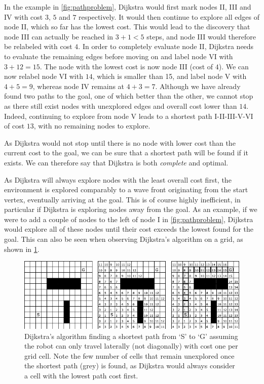 In the example in \cref{fig:pathproblem}, Dijkstra would first mark nodes II, III and IV with cost $3$, $5$ and $7$ respectively. It would then continue to explore all edges of node II, which so far has the lowest cost. This would lead to the discovery that node III can actually be reached in $3+1<5$ steps, and node III would therefore be relabeled with cost $4$. In order to completely evaluate node II, Dijkstra needs to evaluate the remaining edges before moving on and label node VI with $3+12=15$.
%
The node with the lowest cost is now node III (cost of $4$). We can now relabel node VI with $14$, which is smaller than 15, and label node V with $4+5=9$, whereas node IV remains at $4+3=7$. Although we have already found two paths to the goal, one of which better than the other, we cannot stop as there still exist nodes with unexplored edges and overall cost lower than $14$. Indeed, continuing to explore from node V leads to a shortest path I-II-III-V-VI of cost $13$, with no remaining nodes to explore.

As Dijkstra would not stop until there is no node with lower cost than the current cost to the goal, we can be sure that a shortest path will be found if it exists. We can therefore say that Dijkstra is both \textsl{complete} and optimal.

As Dijkstra will always explore nodes with the least overall cost first, the environment is explored comparably to a wave front originating from the start vertex, eventually arriving at the goal. This is of course highly inefficient, in particular if Dijkstra is exploring nodes away from the goal.
As an example, if we were to add a couple of nodes to the left of node I in \cref{fig:pathproblem}, Dijkstra would explore all of these nodes until their cost exceeds the lowest found for the goal. This can also be seen when observing Dijkstra's algorithm on a grid, as shown in \cref{fig:dijkstragrid}.

\begin{figure}[htb]
    \centering
    \includegraphics[width=\textwidth]{figs/dijkstragrid.pdf}
    \caption{Dijkstra's algorithm finding a shortest path from `S' to `G' assuming the robot can only travel laterally (not diagonally) with cost one per grid cell. Note the few number of cells that remain unexplored once the shortest path (grey) is found, as Dijkstra would always consider a cell with the lowest path cost first.\label{fig:dijkstragrid}}
\end{figure}

